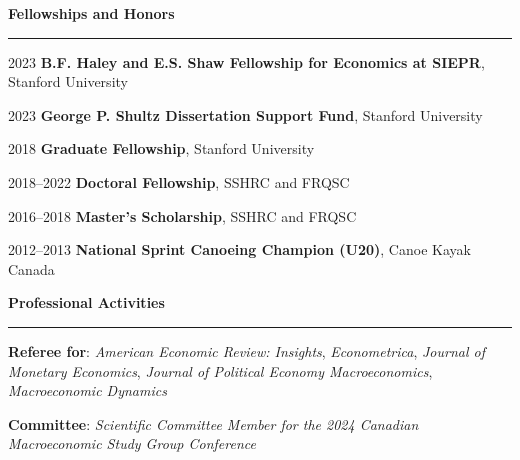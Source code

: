 \documentclass[12pt]{article}
\begin{document}
\vspace{0.5cm}

{\large \textbf{Fellowships and Honors}} \\
\noindent\rule[0.5\baselineskip]{\textwidth}{1pt}

\begin{small}

2023 \tabto{3cm} \textbf{B.F. Haley and E.S. Shaw Fellowship for Economics at SIEPR}, Stanford University

2023 \tabto{3cm} \textbf{George P. Shultz Dissertation Support Fund}, Stanford University

2018 \tabto{3cm} \textbf{Graduate Fellowship}, Stanford University

2018--2022 \tabto{3cm} \textbf{Doctoral Fellowship}, SSHRC and FRQSC

2016--2018 \tabto{3cm} \textbf{Master's Scholarship}, SSHRC and FRQSC

2012--2013 \tabto{3cm} \textbf{National Sprint Canoeing Champion (U20)}, Canoe Kayak Canada
\end{small}

\vspace{0.5cm}

{\large \textbf{Professional Activities}} \\
\noindent\rule[0.5\baselineskip]{\textwidth}{1pt}

{\small \textbf{Referee for}: \textit{American Economic Review: Insights}, \textit{Econometrica}, \textit{Journal of Monetary Economics}, \textit{Journal of Political Economy Macroeconomics}, \textit{Macroeconomic Dynamics}}

{\small \textbf{Committee}: \textit{Scientific Committee Member for the 2024 Canadian Macroeconomic Study Group Conference}}
\end{document}

